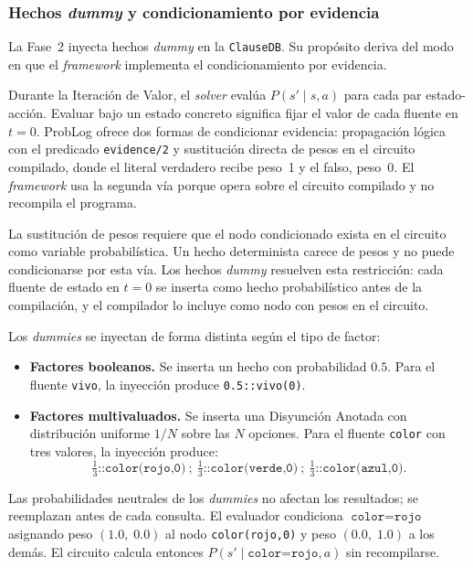 \subsubsection{Hechos \textit{dummy} y condicionamiento por evidencia}
\label{sec:di-dummy-evidencia}

La Fase~2 inyecta hechos \textit{dummy} en la \texttt{ClauseDB}. Su propósito
deriva del modo en que el \textit{framework} implementa el condicionamiento por
evidencia.

Durante la Iteración de Valor, el \textit{solver} evalúa $P(s' \mid s, a)$ para
cada par estado-acción. Evaluar bajo un estado concreto significa fijar el valor
de cada fluente en $t = 0$. ProbLog ofrece dos formas de condicionar evidencia:
propagación lógica con el predicado \texttt{evidence/2} y sustitución directa de
pesos en el circuito compilado, donde el literal verdadero recibe peso~1 y el
falso, peso~0. El \textit{framework} usa la segunda vía porque opera sobre el
circuito compilado y no recompila el programa.

La sustitución de pesos requiere que el nodo condicionado exista en el circuito
como variable probabilística. Un hecho determinista carece de pesos y no puede
condicionarse por esta vía. Los hechos \textit{dummy} resuelven esta restricción:
cada fluente de estado en $t = 0$ se inserta como hecho probabilístico antes de
la compilación, y el compilador lo incluye como nodo con pesos en el circuito.

Los \textit{dummies} se inyectan de forma distinta según el tipo de factor:

\begin{itemize}
    \item \textbf{Factores booleanos.} Se inserta un hecho con probabilidad
        $0.5$. Para el fluente \texttt{vivo}, la inyección produce
        \texttt{0.5::vivo(0)}.

    \item \textbf{Factores multivaluados.} Se inserta una Disyunción Anotada
        con distribución uniforme $1/N$ sobre las $N$ opciones. Para el fluente
        \texttt{color} con tres valores, la inyección produce:
        \[
          \tfrac{1}{3}\texttt{::color(rojo,0)}\ ;\ \tfrac{1}{3}\texttt{::color(verde,0)}\ ;\ \tfrac{1}{3}\texttt{::color(azul,0)}.
        \]
\end{itemize}

Las probabilidades neutrales de los \textit{dummies} no afectan los resultados;
se reemplazan antes de cada consulta. El evaluador condiciona
$\texttt{color} = \texttt{rojo}$ asignando peso $(1.0,\; 0.0)$ al nodo
\texttt{color(rojo,0)} y peso $(0.0,\; 1.0)$ a los demás. El circuito calcula
entonces $P(s' \mid \texttt{color=rojo}, a)$ sin recompilarse.

